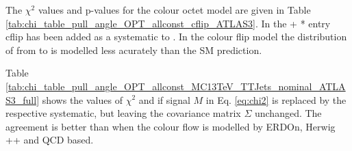 The $\chi^{2}$ values and p-values for the \PW colour octet model are given in Table \ref{tab:chi_table_pull_angle_OPT_allconst_cflip_ATLAS3}. In the \POWHEG+ * entry \ttbar cflip has been added as a systematic to \ttbar. In the colour flip model the distribution of \pullangle from \leadingjet to \scndleadingjet is modelled less acurately than the SM prediction.
  
Table \ref{tab:chi_table_pull_angle_OPT_allconst_MC13TeV_TTJets_nominal_ATLAS3_full} shows the values of $\chi^{2}$ and if signal $M$ in Eq. \ref{eq:chi2} is replaced by the respective systematic, but leaving the covariance matrix $\Sigma$ unchanged. The agreement is better than \ttbar when the colour flow is modelled by \ttbar ERDOn, \ttbar Herwig ++ and \ttbar QCD based.





















